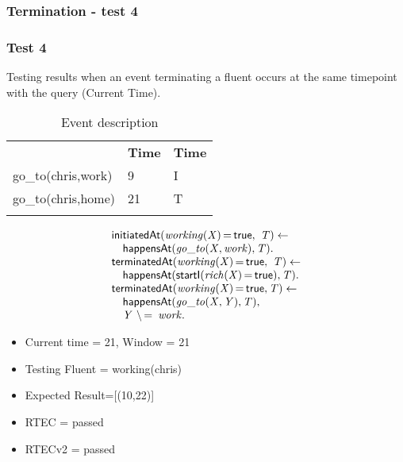 \documentclass[8pt]{beamer}
\DeclareMathOperator{\val}{=}  %
\def \patsize {}
\def\happensAt{\textsf{\patsize happensAt}}
\def\initiatedAt{\textsf{\patsize initiatedAt}}
\def\terminatedAt{\textsf{\patsize terminatedAt}}
\def\startI{\textsf{\patsize startI}}
\def\true{\textsf{\patsize true}}
\newenvironment{mysplit}%
  {\arraycolsep 0pt \begin{array}{l}}%
  {\end{array}}
\begin{document}
\begin{frame}
    \frametitle{Termination - test 4}
    \subsubsection{Test 4}
    \small
    Testing results when an event terminating a fluent occurs at the same timepoint with the query (Current Time).\linebreak
    \begin{minipage}{0.48\linewidth}
        \begin{table}[t!]
            \caption{Event description}
            \begin{center}

                \begin{tabular}{lll}
                    \hline\noalign{\smallskip}
                    \multicolumn{1}{l}{\textbf{Event}} & \multicolumn{1}{c}{\textbf{Time}}  & \multicolumn{1}{c}{\textbf{Time}}  \\
                    go\_to(chris,work)&9&I\\
                    go\_to(chris,home)&21&T\\
                    \noalign{\smallskip}
                    \hline
                \end{tabular}
            \end{center}
        \end{table}
    \end{minipage}
    \begin{minipage}{0.48\linewidth}

        \begin{align*}
            \begin{mysplit}
                \initiatedAt\mathit{(working(X)\val\true,\ T)\leftarrow}\\
                \quad    \happensAt\mathit{(go\_to(X,work),T)}.\\
                \terminatedAt\mathit{(working(X)\val\true,\ T) \leftarrow}\\
                \quad    \happensAt\mathit{(\startI(rich(X)\val\true),T)}.\\
                \terminatedAt\mathit{(working(X)\val\true,T)\leftarrow}\\
                \quad    \happensAt\mathit{(go\_to(X,Y),T)},\\
                \quad	 \mathit{Y\ \backslash\val\ work}.\\
            \end{mysplit}
        \end{align*}
    \end{minipage}
    \begin{itemize}
        \item Current time = 21, Window = 21
        \item Testing Fluent = working(chris)
        \item Expected Result=[(10,22)]
        \item RTEC = passed
        \item RTECv2 = passed
    \end{itemize}
\end{frame}
\end{document}
